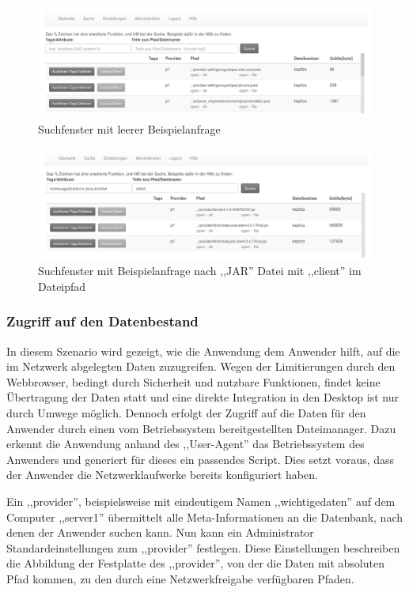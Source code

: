 \documentclass[oneside, ngerman, toc=bibliography,bibliography=totoc,listof=entryprefix, open=right,numbers=noenddot,fontsize=12pt]{scrbook}
\begin{document}
\begin{figure}[htbp] 
    \centering
    \includegraphics[width=\textwidth]{Masterarbeit_Bilder/www_suche.png}
    \caption{Suchfenster mit leerer Beispielanfrage}
    \label{fig:www-suche}
\end{figure}  

\begin{figure}[htbp] 
    \centering
    \includegraphics[width=\textwidth]{Masterarbeit_Bilder/www_suche2.png}
    \caption{Suchfenster mit Beispielanfrage nach ,,JAR'' Datei mit ,,client'' im Dateipfad}
    \label{fig:www-suche2}
\end{figure}  

 
\subsubsection{Zugriff auf den Datenbestand}
In diesem Szenario wird gezeigt, wie die Anwendung dem Anwender hilft, auf die im Netzwerk abgelegten Daten zuzugreifen. Wegen der Limitierungen durch den Webbrowser, bedingt durch Sicherheit und nutzbare Funktionen, findet keine Übertragung der Daten statt und eine direkte Integration in den Desktop ist nur durch Umwege möglich.
Dennoch erfolgt der Zugriff auf die Daten für den Anwender  durch einen vom Betriebssystem bereitgestellten Dateimanager. 
Dazu erkennt die Anwendung anhand des ,,User-Agent'' das Betriebssystem des Anwenders und generiert für dieses ein passendes Script. Dies setzt voraus, dass der Anwender die Netzwerklaufwerke bereits konfiguriert haben.

Ein ,,provider'', beispielsweise mit eindeutigem Namen ,,wichtigedaten'' auf dem Computer ,,server1'' übermittelt alle Meta-Informationen an die Datenbank, nach denen der Anwender suchen kann. Nun kann ein Administrator Standardeinstellungen zum ,,provider'' festlegen. Diese Einstellungen beschreiben die Abbildung der Festplatte des ,,provider'', von der die Daten mit absoluten Pfad kommen, zu den durch eine Netzwerkfreigabe verfügbaren Pfaden.
\end{document}
